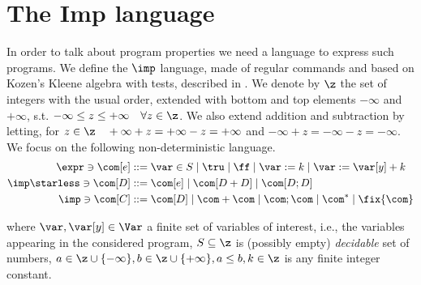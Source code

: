 \section{The Imp language}

In order to talk about program properties we need a language to
express such programs. We define the \(\imp\) language, made of
regular commands and based on Kozen’s Kleene algebra with tests,
described in \cite{kozen1997kleene}.  We denote by \(\z\) the set of
integers with the usual order, extended with bottom and top elements
\(-\infty\) and \(+\infty\), s.t.
\(-\infty \leq z \leq +\infty \quad \forall z \in \z\). We also extend
addition and subtraction by letting, for
\(z \in \z \quad +\infty + z = + \infty - z = + \infty\) and
\(-\infty + z = - \infty -z = - \infty\).  We focus on the following
non-deterministic language.
\begin{align*}
  \expr \ni \com[e] ::= & \; \var \in S \mid \tru \mid \ff \mid \var := k \mid \var := \var[y] + k \\
  \imp\starless \ni \com[D] ::= & \; \com[e] \mid \com[D + D] \mid \com[D ; D] \\
  \imp \ni \com[C] ::= & \; \com[D] \mid \com + \com \mid \com ; \com \mid \com^* \mid \fix{\com}
\end{align*}

where \(\var, \var[y] \in \Var\) a finite set of variables of
interest, i.e., the variables appearing in the considered program,
\(S\subseteq \z\) is (possibly empty) \emph{decidable} set of numbers,
\(a \in \z\cup \{-\infty\}, b\in\z\cup\{+\infty\}, a\leq b, k \in \z\)
is any finite integer constant.
